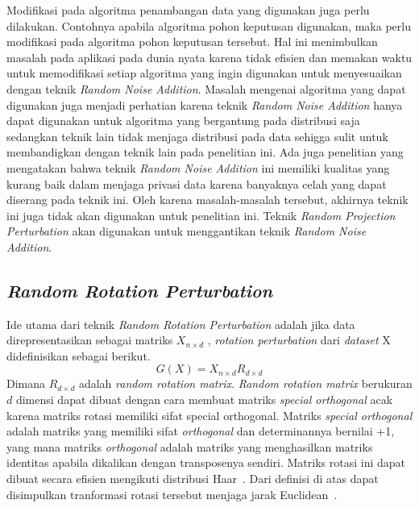 Modifikasi pada algoritma penambangan data yang digunakan juga perlu dilakukan. Contohnya apabila algoritma pohon keputusan digunakan, maka perlu modifikasi pada algoritma pohon keputusan tersebut. Hal ini menimbulkan masalah pada aplikasi pada dunia nyata karena tidak efisien dan memakan waktu untuk memodifikasi setiap algoritma yang ingin digunakan untuk menyesuaikan dengan teknik \textit{Random Noise Addition}. Masalah mengenai algoritma yang dapat digunakan juga menjadi perhatian karena teknik \textit{Random Noise Addition} hanya dapat digunakan untuk algoritma yang bergantung pada distribusi saja sedangkan teknik lain tidak menjaga distribusi pada data sehigga sulit untuk membandigkan dengan teknik lain pada penelitian ini. Ada juga penelitian yang mengatakan bahwa teknik \textit{Random Noise Addition} ini memiliki kualitas yang kurang baik dalam menjaga privasi data karena banyaknya celah yang dapat diserang pada teknik ini. Oleh karena masalah-masalah tersebut, akhirnya teknik ini juga tidak akan digunakan untuk penelitian ini. Teknik \textit{Random Projection Perturbation} akan digunakan untuk menggantikan teknik \textit{Random Noise Addition}.

\subsection{\textit{Random Rotation Perturbation}}
\label{subsec:rrp}

Ide utama dari teknik \textit{Random Rotation Perturbation} adalah jika data direpresentasikan sebagai matriks \(X_{n \times d}\) , \textit{rotation perturbation} dari \textit{dataset} X didefinisikan sebagai berikut.
\begin{equation}
	G(X) = X_{n \times d} R_{d \times d}
\end{equation}
Dimana \(R_{d \times d}\) adalah \textit{random rotation matrix}. \textit{Random rotation matrix} berukuran \(d\) dimensi dapat dibuat dengan cara membuat matriks \textit{special orthogonal} acak karena matriks rotasi memiliki sifat {special orthogonal}. Matriks \textit{special orthogonal} adalah matriks yang memiliki sifat \textit{orthogonal} dan determinannya bernilai +1, yang mana matriks \textit{orthogonal} adalah matriks yang menghasilkan matriks identitas apabila dikalikan dengan transposenya sendiri. Matriks rotasi ini dapat dibuat secara efisien mengikuti distribusi Haar~\cite{stewart:80:orthogonal}. Dari definisi di atas dapat disimpulkan tranformasi rotasi tersebut menjaga jarak Euclidean~\cite{rotation:05:chenliu}.


